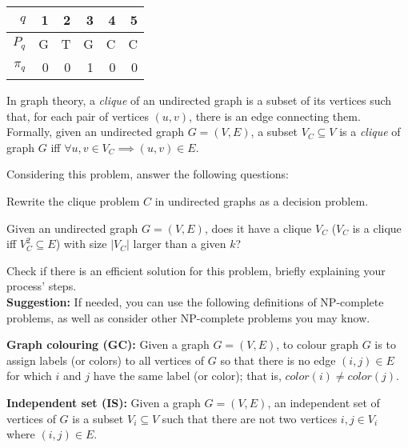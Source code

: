 {\begin{center} \begin{tabular}{r | rrrrr}
    $q$     & 1 & 2 & 3 & 4 & 5 \\ \hline
    $P_q$   & G & T & G & C & C \\ \hline
    $\pi_q$ & 0 & 0 & 1 & 0 & 0
\end{tabular} \end{center}

In graph theory, a \emph{clique} of an undirected graph is a subset of its vertices such that, for each pair of vertices $(u, v)$, there is an edge connecting them. Formally, given an undirected graph $G=(V,E)$, a subset $V_C \subseteq V$ is a \emph{clique} of graph $G$ iff $\forall u, v \in V_C \implies (u,v) \in E$.

Considering this problem, answer the following questions:

Rewrite the clique problem $C$ in undirected graphs as a decision problem.

\ansseparator

Given an undirected graph $G=(V,E)$, does it have a clique $V_C$ ($V_C$ is a clique iff $V_C^2 \subseteq E$) with size $|V_C|$ larger than a given $k$?

Check if there is an efficient solution for this problem, briefly explaining your process' steps.\\

\textbf{Suggestion:} If needed, you can use the following definitions of NP-complete problems, as well as consider other NP-complete problems you may know.

\textbf{Graph colouring (GC):} Given a graph $G=(V,E)$, to colour graph $G$ is to assign labels (or colors) to all vertices of $G$ so that there is no edge $(i,j) \in E$ for which $i$ and $j$ have the same label (or color); that is, $color(i) \neq color(j)$.

\textbf{Independent set (IS):} Given a graph $G=(V,E)$, an independent set of vertices of $G$ is a subset $V_i \subseteq V$ such that there are not two vertices $i, j \in V_i$ where $(i,j) \in E$.

\ansseparator

}
